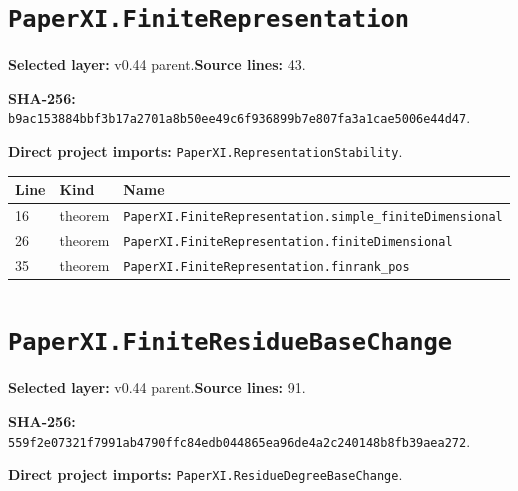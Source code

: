 \documentclass[10pt,oneside]{book}
\begin{document}
\section{\texorpdfstring{\nolinkurl{PaperXI.FiniteRepresentation}}{PaperXI.FiniteRepresentation}}\label{module:PaperXI.FiniteRepresentation}

\textbf{Selected layer:} v0.44 parent.\quad\textbf{Source lines:} 43.\par\textbf{SHA-256:} {\scriptsize\nolinkurl{b9ac153884bbf3b17a2701a8b50ee49c6f936899b7e807fa3a1cae5006e44d47}}.


\textbf{Direct project imports:} \nolinkurl{PaperXI.RepresentationStability}.

\begin{longtable}{@{}p{}p{}p{}@{}}\toprule Line&Kind&Name\\\midrule\endhead

16&theorem&\nolinkurl{PaperXI.FiniteRepresentation.simple_finiteDimensional}\\

26&theorem&\nolinkurl{PaperXI.FiniteRepresentation.finiteDimensional}\\

35&theorem&\nolinkurl{PaperXI.FiniteRepresentation.finrank_pos}\\

\bottomrule\end{longtable}

\section{\texorpdfstring{\nolinkurl{PaperXI.FiniteResidueBaseChange}}{PaperXI.FiniteResidueBaseChange}}\label{module:PaperXI.FiniteResidueBaseChange}

\textbf{Selected layer:} v0.44 parent.\quad\textbf{Source lines:} 91.\par\textbf{SHA-256:} {\scriptsize\nolinkurl{559f2e07321f7991ab4790ffc84edb044865ea96de4a2c240148b8fb39aea272}}.


\textbf{Direct project imports:} \nolinkurl{PaperXI.ResidueDegreeBaseChange}.
\end{document}
